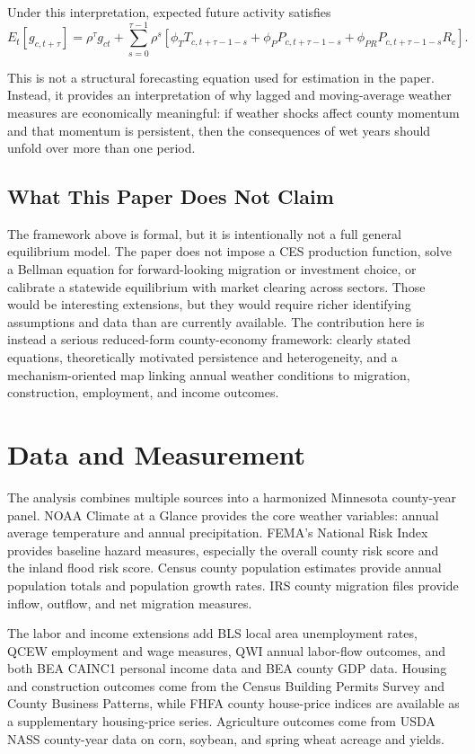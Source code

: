 \documentclass[12pt]{article}
\begin{document}
Under this interpretation, expected future activity satisfies
\begin{equation}
E_t\!\left[g_{c,t+\tau}\right]
= \rho^\tau g_{ct}
 + \sum_{s=0}^{\tau-1}\rho^s\left[\phi_T T_{c,t+\tau-1-s} + \phi_P P_{c,t+\tau-1-s} + \phi_{PR} P_{c,t+\tau-1-s}R_c\right].
\end{equation}

This is not a structural forecasting equation used for estimation in the paper. Instead, it provides an interpretation of why lagged and moving-average weather measures are economically meaningful: if weather shocks affect county momentum and that momentum is persistent, then the consequences of wet years should unfold over more than one period.

\subsection{What This Paper Does Not Claim}

The framework above is formal, but it is intentionally not a full general equilibrium model. The paper does not impose a CES production function, solve a Bellman equation for forward-looking migration or investment choice, or calibrate a statewide equilibrium with market clearing across sectors. Those would be interesting extensions, but they would require richer identifying assumptions and data than are currently available. The contribution here is instead a serious reduced-form county-economy framework: clearly stated equations, theoretically motivated persistence and heterogeneity, and a mechanism-oriented map linking annual weather conditions to migration, construction, employment, and income outcomes.

\section{Data and Measurement}

The analysis combines multiple sources into a harmonized Minnesota county-year panel. NOAA Climate at a Glance provides the core weather variables: annual average temperature and annual precipitation. FEMA's National Risk Index provides baseline hazard measures, especially the overall county risk score and the inland flood risk score. Census county population estimates provide annual population totals and population growth rates. IRS county migration files provide inflow, outflow, and net migration measures.

The labor and income extensions add BLS local area unemployment rates, QCEW employment and wage measures, QWI annual labor-flow outcomes, and both BEA CAINC1 personal income data and BEA county GDP data. Housing and construction outcomes come from the Census Building Permits Survey and County Business Patterns, while FHFA county house-price indices are available as a supplementary housing-price series. Agriculture outcomes come from USDA NASS county-year data on corn, soybean, and spring wheat acreage and yields.
\end{document}
